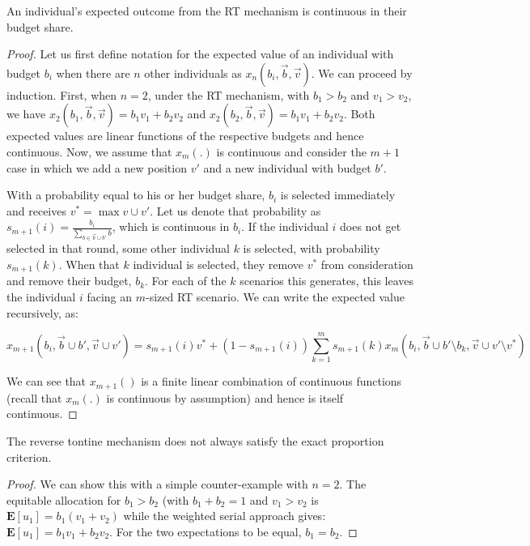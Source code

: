 \begin{proposition}
An individual's expected outcome from the RT mechanism is continuous
in their budget share.
\end{proposition}
\begin{proof} 
  
  Let us first define notation for the expected value of an individual
  with budget $b_i$ when there are $n$ other individuals as $x_n(b_i,
  \vec{b}, \vec{v})$. We can proceed by induction. First, when $n=2$,
  under the RT mechanism, with $b_1 > b_2$ and $v_1 > v_2$, we have
  $x_2(b_1, \vec{b}, \vec{v}) = b_1v_1 + b_2v_2$ and $x_2(b_2,
  \vec{b}, \vec{v}) = b_1v_1 + b_2v_2$. Both expected values are
  linear functions of the respective budgets and hence
  continuous. Now, we assume that $x_m(.)$ is continuous and consider
  the $m+1$ case in which we add a new position $v'$ and a new
  individual with budget $b'$.

With a probability equal to his or her budget share, $b_i$ is selected
immediately and receives $v^* = \max v \cup v'$. Let us denote that
probability as $s_{m+1}(i) = \frac{b_i}{\sum_{b \in \vec{b} \cup b'}
  b}$, which is continuous in $b_i$. If the individual $i$ does not
get selected in that round, some other individual $k$ is selected,
with probability $s_{m+1}(k)$. When that $k$ individual is selected,
they remove $v^*$ from consideration and remove their budget,
$b_k$. For each of the $k$ scenarios this generates, this leaves the
individual $i$ facing an $m$-sized RT scenario. We can write the
expected value recursively, as:


\begin{equation*} 
x_{m+1}(b_i, \vec{b} \cup b', \vec{v} \cup v') = 
s_{m+1}(i) v^* + 
\left(1- s_{m+1}(i) \right) 
\sum_{k=1}^{m} s_{m+1}(k) x_m (b_i, \vec{b} \cup b' \setminus b_k, \vec{v} \cup v' \setminus v^*) 
\end{equation*}


We can see that $x_{m+1}()$ is a finite linear combination of
continuous functions (recall that $x_{m}(.)$ is continuous by
assumption) and hence is itself continuous.
\end{proof} 

\begin{proposition} 
  The reverse tontine mechanism does not always satisfy the exact
  proportion criterion.
\end{proposition} 
\begin{proof}
We can show this with a simple counter-example with $n=2$. The
equitable allocation for $b_1 > b_2$ (with $b_1 + b_2 = 1$ and $v_1 >
v_2$ is $\mathbf{E}[u_1] = b_1 \left(v_1 + v_2\right)$ while the
weighted serial approach gives: $\mathbf{E}[u_1] = b_1 v_1 + b_2
v_2$. For the two expectations to be equal, $b_1 = b_2$.
\end{proof} 

